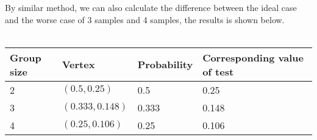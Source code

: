 By similar method, we can also calculate the difference between the ideal case and the worse case of 3 samples and 4 samples, the results is shown below.
\\
\\
\begin{tabular}{p{3cm}p{4cm}p{4cm}p{5cm}}
\toprule
\textbf{Group size}&\textbf{Vertex}&\textbf{Probability}&\textbf{Corresponding value of test}\\
\toprule
2&$(0.5,0.25)$&0.5&0.25\\
\midrule
3&$(0.333,0.148)$&0.333&0.148\\
\midrule
4&$(0.25,0.106)$&0.25&0.106\\
\bottomrule
\end{tabular}
